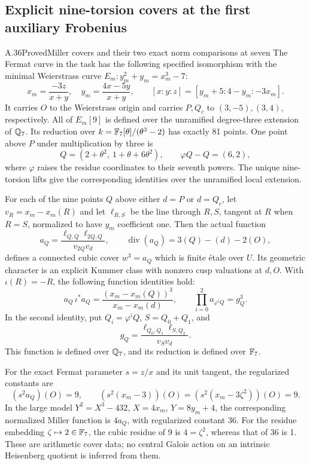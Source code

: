 \subsection{Explicit nine-torsion covers at the first auxiliary Frobenius}

\begin{statement}{A.36}{Proved}{Miller covers and their two exact norm comparisons at seven}
The Fermat curve in the task has the following specified isomorphism
with the minimal Weierstrass curve $E_m:y_m^2+y_m=x_m^3-7$:
\[
 x_m=\frac{-3z}{x+y},\quad
 y_m=\frac{4x-5y}{x+y},\qquad
 [x:y:z]=[y_m+5:4-y_m:-3x_m].                 \tag{A.36.1}
\]
It carries $O$ to the Weierstrass origin and carries
$P,Q_c$ to $(3,-5),(3,4)$, respectively.
All of $E_m[9]$ is defined over the unramified degree-three
extension of $\mathbb Q_7$. Its reduction over
$k=\mathbb F_7[\theta]/(\theta^3-2)$ has exactly 81 points.
One point above $P$ under multiplication by three is
\[
 Q=(2+\theta^2,\ 1+\theta+6\theta^2),\qquad
 \varphi Q-Q=(6,2),                           \tag{A.36.2}
\]
where $\varphi$ raises the residue coordinates to their seventh
powers. The unique nine-torsion lifts give the corresponding
identities over the unramified local extension.

For each of the nine points $Q$ above either $d=P$ or $d=Q_c$,
let $v_R=x_m-x_m(R)$ and let $\ell_{R,S}$ be the line through
$R,S$, tangent at $R$ when $R=S$, normalized to have
$y_m$ coefficient one. Then the actual function
\[
 a_Q=\frac{\ell_{Q,Q}\ell_{2Q,Q}}{v_{2Q}v_d},\qquad
 \operatorname{div}(a_Q)=3(Q)-(d)-2(O),        \tag{A.36.3}
\]
defines a connected cubic cover $w^3=a_Q$ which is finite
\'etale over $U$. Its geometric character is an explicit
Kummer class with nonzero cusp valuations at $d,O$.
With $\iota(R)=-R$, the following function identities hold:
\[
 a_Q\,\iota^*a_Q=\frac{(x_m-x_m(Q))^3}{x_m-x_m(d)},
 \qquad
 \prod_{i=0}^2 a_{\varphi^iQ}=g_Q^3.           \tag{A.36.4}
\]
In the second identity, put $Q_i=\varphi^iQ$,
$S=Q_0+Q_1$, and
\[
       g_Q=\frac{\ell_{Q_0,Q_1}\ell_{S,Q_2}}{v_Sv_d}.
                                                        \tag{A.36.5}
\]
This function is defined over $\mathbb Q_7$, and its reduction is
defined over $\mathbb F_7$.

For the exact Fermat parameter $s=z/x$ and its unit tangent,
the regularized constants are
\[
 (s^2a_Q)(O)=9,
 \qquad (s^2(x_m-3))(O)=(s^2(x_m-3\zeta^2))(O)=9.
                                                        \tag{A.36.6}
\]
In the large model $Y^2=X^3-432$, $X=4x_m$, $Y=8y_m+4$,
the corresponding normalized Miller function is $4a_Q$,
with regularized constant 36. For the residue embedding
$\zeta\mapsto2\in\mathbb F_7$, the cubic residue of 9 is
$4=\zeta^2$, whereas that of 36 is 1.
These are arithmetic cover data; no central Galois action
on an intrinsic Heisenberg quotient is inferred from them.
\end{statement}

